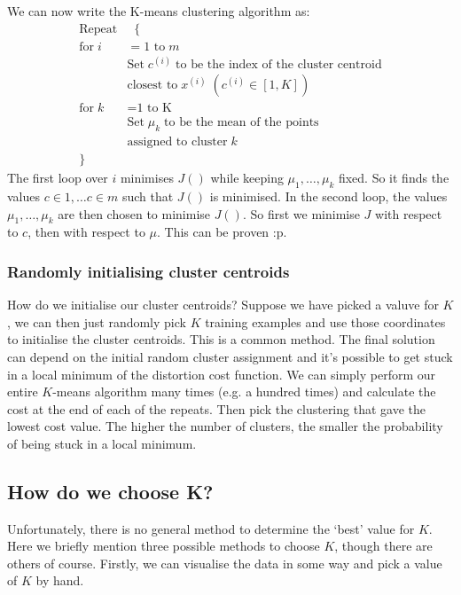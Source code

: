 \documentclass[a4paper, 10pt,hidelinks]{article}
\newcommand{\ind}[1]{^{(#1)}}
\begin{document}
We can now write the K-means clustering algorithm as:
\begin{align}
\text{Repeat} &\;\;\{ \nonumber \\
\text{for}\; i &= \text{1 to}\; m \nonumber \\
&\text{Set}\; c\ind{i} \;\text{to be the index of the cluster centroid} \nonumber \\
&\text{closest to} \; x\ind{i} \;(c\ind{i} \in [1, K]) \nonumber \\
\text{for}\;k &= \text{1 to K} \nonumber \\
&\text{Set}\; \mu_k \; \text{to be the mean of the points} \nonumber \\
&\text{assigned to cluster} \; k  \nonumber \\
\}\;\;\quad \quad & 
\end{align}
The first loop over $i$ minimises $J()$ while keeping $\mu_1, \ldots, \mu_k$ fixed. So it finds the values $c\in{1}, \ldots c\in{m}$ such that $J()$ is minimised. In the second loop, the values $\mu_1, \ldots, \mu_k$ are then chosen to minimise $J()$. So first we minimise $J$ with respect to $c$, then with respect to $\mu$. This can be proven :p.

\subsubsection{Randomly initialising cluster centroids}
How do we initialise our cluster centroids? Suppose we have picked a valuve for $K$, we can then just randomly pick $K$ training examples and use those coordinates to initialise the cluster centroids. This is a common method. The final solution can depend on the initial random cluster assignment and it's possible to get stuck in a local minimum of the distortion cost function. We can simply perform our entire $K$-means algorithm many times (e.g. a hundred times) and calculate the cost at the end of each of the repeats. Then pick the clustering that gave the lowest cost value. The higher the number of clusters, the smaller the probability of being stuck in a local minimum. 

\subsection{How do we choose K?}
Unfortunately, there is no general method to determine the `best' value for $K$. Here we briefly mention three possible methods to choose $K$, though there are others of course. Firstly, we can visualise the data in some way and pick a value of $K$ by hand. 
\end{document}
